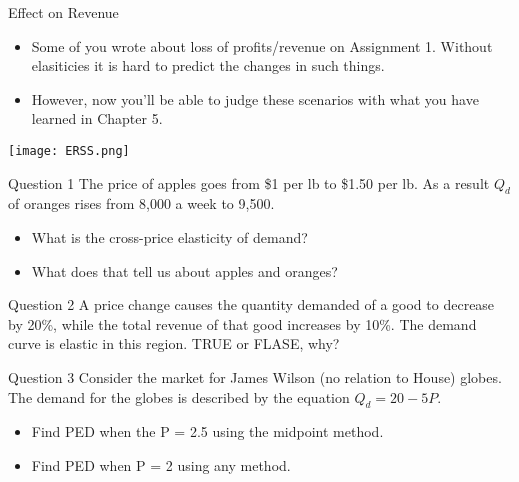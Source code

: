 \documentclass[aspectratio=169]{beamer}
\begin{document}
\begin{frame}{Effect on Revenue}
    \begin{itemize}
        \item Some of you wrote about loss of profits/revenue on Assignment 1. Without elasiticies it is hard to predict the changes in such things.
        \item However, now you'll be able to judge these scenarios with what you have learned in Chapter 5.
    \end{itemize}  
   
    \begin{center}
        \texttt{[image: ERSS.png]}
    \end{center}
\end{frame}

\begin{frame}
    \begin{block}{Question 1}
        The price of apples goes from \$1 per lb to \$1.50 per lb. As a result $Q_d$ of oranges rises from 8,000 a week to 9,500.
        \begin{itemize}
            \item What is the cross-price elasticity of demand?
            \item What does that tell us about apples and oranges?
        \end{itemize}
    \end{block}

    \begin{block}{Question 2}
        A price change causes the quantity demanded of a good to decrease by 20\%, while the total revenue of that good increases by 10\%. The demand curve is elastic in this region. TRUE or FLASE, why?  
    \end{block}

    \begin{block}{Question 3}
        Consider the market for James Wilson (no relation to House) globes. The demand for the globes is described by the equation $ Q_d = 20-5P$. 
        \begin{itemize}
            \item Find PED when the P = 2.5 using the midpoint method.
            \item Find PED when P = 2 using any method.
        \end{itemize}
    \end{block}
\end{frame}
\end{document}
